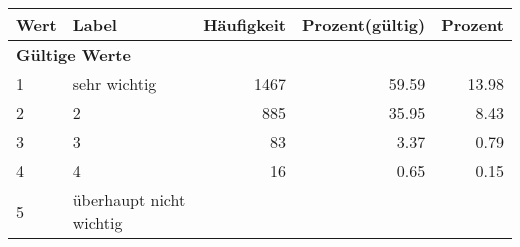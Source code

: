      \begin{longtable}{lXrrr}
     \toprule
     \textbf{Wert} & \textbf{Label} & \textbf{Häufigkeit} & \textbf{Prozent(gültig)} & \textbf{Prozent} \\
     \endhead
     \midrule
     \multicolumn{5}{l}{\textbf{Gültige Werte}}\\

     1 &
     \multicolumn{1}{X}{ sehr wichtig   } &


       \num{1467} &
       \num[round-mode=places,round-precision=2]{59,59} &
         \num[round-mode=places,round-precision=2]{13,98} \\

     2 &
     \multicolumn{1}{X}{ 2   } &


       \num{885} &
       \num[round-mode=places,round-precision=2]{35,95} &
         \num[round-mode=places,round-precision=2]{8,43} \\

     3 &
     \multicolumn{1}{X}{ 3   } &


       \num{83} &
       \num[round-mode=places,round-precision=2]{3,37} &
         \num[round-mode=places,round-precision=2]{0,79} \\

     4 &
     \multicolumn{1}{X}{ 4   } &


       \num{16} &
       \num[round-mode=places,round-precision=2]{0,65} &
         \num[round-mode=places,round-precision=2]{0,15} \\

     5 &
     \multicolumn{1}{X}{ überhaupt nicht wichtig   } &



\end{longtable}
